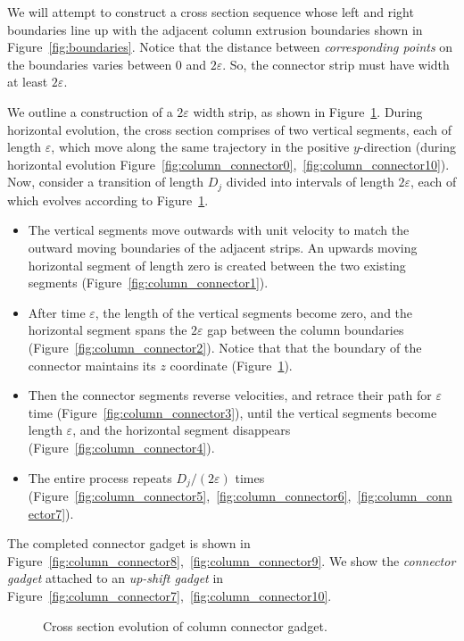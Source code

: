 We will attempt to construct a cross section sequence whose left and right boundaries
line up with the adjacent column extrusion boundaries shown in Figure~\ref{fig:boundaries}.
Notice that the distance between \emph{corresponding points} on the boundaries varies between $0$ and $2\varepsilon$.
So, the connector strip must have width at least $2\varepsilon$.

We outline a construction of a $2\varepsilon$ width strip, as shown in Figure~\ref{fig:connector_cross_section}.
During horizontal evolution, the cross section comprises of two vertical segments, each of length $\varepsilon$,
which move along the same trajectory in the positive $y$-direction
(during horizontal evolution Figure~\ref{fig:column_connector0},~\ref{fig:column_connector10}).
Now, consider a transition of length $D_j$ divided into intervals of length $2\varepsilon$,
each of which evolves according to Figure~\ref{fig:connector_cross_section}.
\begin{itemize}
    \item The vertical segments move outwards with unit velocity to match the outward moving boundaries of the adjacent strips.
          An upwards moving horizontal segment of length zero is created between the two existing segments (Figure~\ref{fig:column_connector1}).
\end{itemize}

\begin{itemize}[resume, before = \vspace*{-\dimexpr\topsep+\partopsep\relax}]
    \item After time $\varepsilon$, the length of the vertical segments become zero,
          and the horizontal segment spans the $2\varepsilon$ gap between the column boundaries (Figure~\ref{fig:column_connector2}).
          Notice that that the boundary of the connector maintains its $z$ coordinate (Figure~\ref{fig:connector_cross_section}).
    \item Then the connector segments reverse velocities, and retrace their path for $\varepsilon$ time (Figure~\ref{fig:column_connector3}),
          until the vertical segments become length $\varepsilon$, and the horizontal segment disappears (Figure~\ref{fig:column_connector4}).
    \item The entire process repeats $D_j/(2\varepsilon)$ times (Figure~\ref{fig:column_connector5},~\ref{fig:column_connector6},~\ref{fig:column_connector7}).
\end{itemize}

The completed connector gadget is shown in Figure~\ref{fig:column_connector8},~\ref{fig:column_connector9}.
We show the \emph{connector gadget} attached to an \emph{up-shift gadget} in Figure~\ref{fig:column_connector7},~\ref{fig:column_connector10}.
\graphicspath{{./figures/}}
\begin{figure}[!h]
    \def\svgwidth{1.0\textwidth}
    \caption{
    Cross section evolution of column connector gadget.
    }
    \vspace{-1.5em}
    \label{fig:connector_cross_section}
\end{figure}




